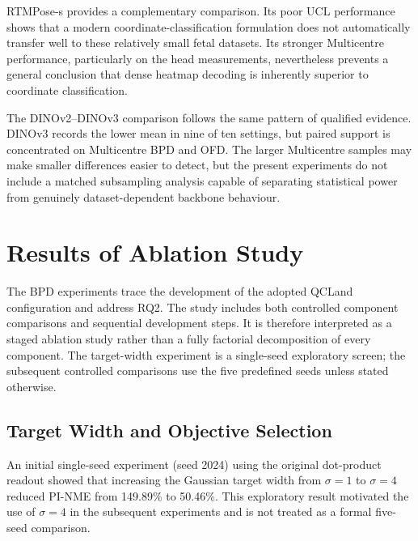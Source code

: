 RTMPose-s provides a complementary comparison. Its poor UCL
performance shows that a modern coordinate-classification formulation
does not automatically transfer well to these relatively small fetal
datasets. Its stronger Multicentre performance, particularly on the
head measurements, nevertheless prevents a general conclusion that
dense heatmap decoding is inherently superior to coordinate
classification.

The DINOv2--DINOv3 comparison follows the same pattern of qualified
evidence. DINOv3 records the lower mean in nine of ten settings, but
paired support is concentrated on Multicentre BPD and OFD. The larger
Multicentre samples may make smaller differences easier to detect, but
the present experiments do not include a matched subsampling analysis
capable of separating statistical power from genuinely
dataset-dependent backbone behaviour.



\section{Results of Ablation Study}
\label{sec:results-development}
\label{sec:results-track-a}

The BPD experiments trace the development of the adopted QCLand
configuration and address RQ2. The study includes both controlled
component comparisons and sequential development steps. It is
therefore interpreted as a staged ablation study rather than a fully
factorial decomposition of every component. The target-width
experiment is a single-seed exploratory screen; the subsequent
controlled comparisons use the five predefined seeds unless stated
otherwise.


\subsection{Target Width and Objective Selection}
\label{sec:results-bpd-sigma}
\label{sec:results-bpd-loss}

An initial single-seed experiment (seed 2024) using the original
dot-product readout showed that increasing the Gaussian target width
from $\sigma=1$ to $\sigma=4$ reduced PI-NME from 149.89\% to
50.46\%. This exploratory result motivated the use of $\sigma=4$ in
the subsequent experiments and is not treated as a formal five-seed
comparison.


